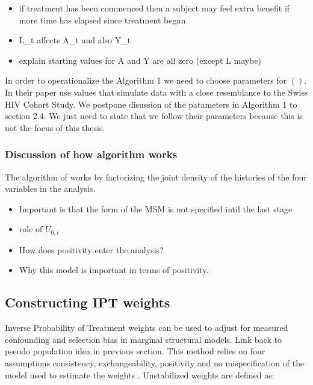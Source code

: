 \documentclass[11pt]{article}
\providecommand{\tightlist}{%
      \setlength{\itemsep}{0pt}\setlength{\parskip}{0pt}}
\begin{document}
\begin{itemize}
\tightlist
\item
  if treatment has been commenced then a subject may feel extra benefit
  if more time has elapsed since treatment began
\item
  L\_t affects A\_t and also Y\_t
\item
  explain starting values for A and Y are all zero (except L maybe)
\end{itemize}

In order to operationalize the Algorithm 1 we need to choose parameters
for \(()\). In their paper \citet{Havercroft2012} use values that
simulate data with a close resemblance to the Swiss HIV Cohort Study. We
postpone disussion of the patameters in Algorithm 1 to section 2.4. We
just need to state that we follow their parameters because this is not
the focus of this thesis.

\subsubsection{Discussion of how algorithm
works}\label{discussion-of-how-algorithm-works}

The algorithm of \citet{Havercroft2012} works by factorizing the joint
density of the histories of the four variables in the analysis.

\begin{itemize}
\tightlist
\item
  Important is that the form of the MSM is not specified intil the last
  stage
\item
  role of \(U_{0, i}\)
\item
  How does positivity enter the analysis?
\item
  Why this model is important in terms of positivity.
\end{itemize}

\subsection{Constructing IPT weights}\label{constructing-ipt-weights}

Inverse Probability of Treatment weights can be used to adjust for
measured confounding and selection bias in marginal structural models.
Link back to pseudo population idea in previous section. This method
relies on four assumptions consistency, exchangeability, positivity and
no mispecification of the model used to estimate the weights
\citet{Cole2008}. Unstabilized weights are defined as:
\end{document}
